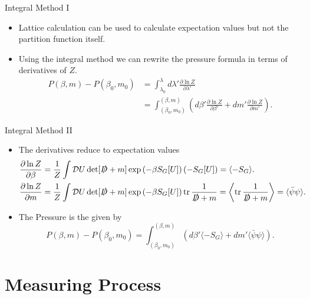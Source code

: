 \documentclass[
	english, %
	design=2023, %
	]{tudabeamer}
\newcommand{\rbr}[1]{\left(#1\right)}
\DeclareMathOperator{\tr}{tr}
\begin{document}
\begin{frame}{Integral Method I}
    \begin{itemize}
        \item Lattice calculation can be used to calculate expectation values but not the partition function itself.
        \item Using the integral method we can rewrite the pressure formula in terms of derivatives of $Z$.
        \begin{align}
            P(\beta, m)-P(\beta_0,m_0)&= \int_{\lambda_0}^{\lambda}d\lambda'\frac{\partial \ln Z}{\partial \lambda'}\\
            &=\int_{(\beta_0,m_0)}^{(\beta,m)}\rbr{d\beta'\frac{\partial\ln Z}{\partial \beta'}+dm'\frac{\partial \ln Z}{\partial m'}}.
        \end{align}
    \end{itemize}
\end{frame}

\begin{frame}{Integral Method II}
    \begin{itemize}
        \item The derivatives reduce to expectation values
        \begin{align}
            \frac{\partial \ln Z}{\partial \beta}&=\frac{1}{Z}\int \mathcal DU \det[\slashed D+m]\exp\rbr{-\beta S_G[U]} (-S_G[U])=\langle-S_G\rangle.\\
            \frac{\partial \ln Z}{\partial m}&=\frac{1}{Z}\int \mathcal DU \det[\slashed D+m]\exp\rbr{-\beta S_G[U]} \tr\frac{1}{\slashed D+m}
     =\left\langle\tr\frac{1}{\slashed D+m}\right\rangle=\langle\bar\psi\psi\rangle.
        \end{align}
        \item The Pressure is the given by
        \begin{equation}
            P(\beta, m)-P(\beta_0,m_0)=\int_{(\beta_0,m_0)}^{(\beta,m)}\rbr{d\beta'\langle-S_G\rangle+dm'\langle\bar\psi\psi\rangle}. 
        \end{equation}
    \end{itemize}
\end{frame}




\section{Measuring Process}

\begin{frame}
\sectionpage
\end{frame}
\end{document}
